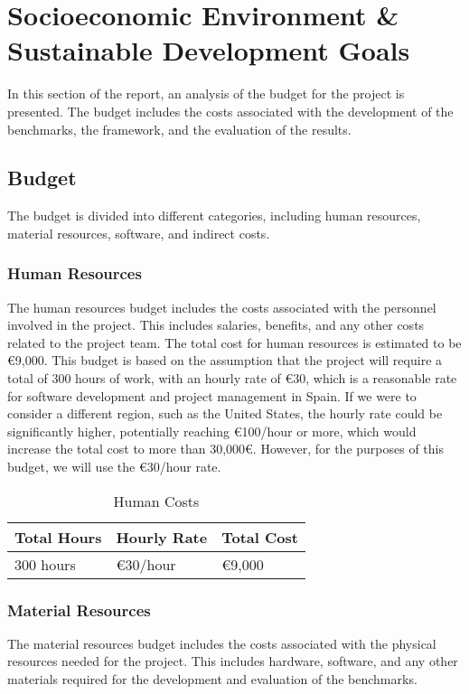 \chapter{Socioeconomic Environment \& Sustainable Development Goals}\label{chap:economic-env}
In this section of the report, an analysis of the budget for the project is presented. The budget includes the costs associated with the development of the benchmarks, the framework, and the evaluation of the results.

\section{Budget}
The budget is divided into different categories, including human resources, material resources, software, and indirect costs.

\subsection{Human Resources}
The human resources budget includes the costs associated with the personnel involved in the project. This includes salaries, benefits, and any other costs related to the project team. The total cost for human resources is estimated to be €9,000. This budget is based on the assumption that the project will require a total of 300 hours of work, with an hourly rate of €30, which is a reasonable rate for software development and project management in Spain. If we were to consider a different region, such as the United States, the hourly rate could be significantly higher, potentially reaching €100/hour or more, which would increase the total cost to more than 30,000€. However, for the purposes of this budget, we will use the €30/hour rate.

\begin{table}[h]
  \centering
  \begin{tabular}{lll}
    \textbf{Total Hours} & \textbf{Hourly Rate} & \textbf{Total Cost} \\
    \hline
    300 hours & €30/hour & €9,000 \\
  \end{tabular}
  \caption{Human Costs}
  \label{tab:human-resources}
\end{table}

\subsection{Material Resources}
The material resources budget includes the costs associated with the physical resources needed for the project. This includes hardware, software, and any other materials required for the development and evaluation of the benchmarks.


